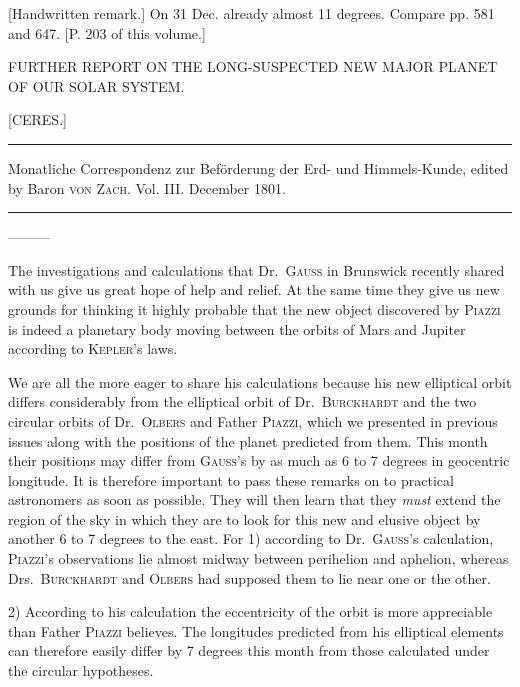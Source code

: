 \expandafter\def\csname HistoricalNoteText16\endcsname{[Handwritten remark.] On 31 Dec. already almost 11 degrees. Compare pp. 581 and 647. [P. 203 of this volume.]}
\clearpage{}%
\fancyhead[L]{\small [CERES.]}
\begin{center}
{\small FURTHER REPORT ON THE LONG-SUSPECTED NEW MAJOR PLANET OF OUR SOLAR SYSTEM.\par}
[CERES.]\par
\medskip\hrule\medskip
{\small Monatliche Correspondenz zur Beförderung der Erd- und Himmels-Kunde, edited by Baron \textsc{von Zach}. Vol. III. December 1801.\par}
\medskip\hrule
\end{center}\medskip
\noindent —\quad —\quad —\par
The investigations and calculations that Dr.\ \textsc{Gauss} in Brunswick recently shared with us give us great hope of help and relief. At the same time they give us new grounds for thinking it highly probable that the new object discovered by \textsc{Piazzi} is indeed a planetary body moving between the orbits of Mars and Jupiter according to \textsc{Kepler}'s laws.

We are all the more eager to share his calculations because his new elliptical orbit differs considerably from the elliptical orbit of Dr.\ \textsc{Burckhardt} and the two circular orbits of Dr.\ \textsc{Olbers} and Father \textsc{Piazzi}, which we presented in previous issues along with the positions of the planet predicted from them. This month their positions may differ from \textsc{Gauss}'s by as much as 6 to 7 degrees in geocentric longitude. It is therefore important to pass these remarks on to practical astronomers as soon as possible. They will then learn that they \textit{must} extend the region of the sky in which they are to look for this new and elusive object by another 6 to 7 degrees to the east. For 1) according to Dr.\ \textsc{Gauss}'s calculation, \textsc{Piazzi}'s observations lie almost midway between perihelion and aphelion, whereas Drs.\ \textsc{Burckhardt} and \textsc{Olbers} had supposed them to lie near one or the other.

2) According to his calculation the eccentricity of the orbit is more appreciable than Father \textsc{Piazzi} believes. The longitudes predicted from his elliptical elements can therefore easily differ by 7 degrees this month from those calculated under the circular hypotheses.

